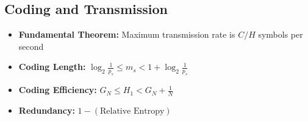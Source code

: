 \documentclass[12pt]{article}
\begin{document}
\subsection*{Coding and Transmission}
\begin{itemize}
    \item \textbf{Fundamental Theorem:} Maximum transmission rate is $C/H$ symbols per second
    \item \textbf{Coding Length:} $\log_2 \frac{1}{p_s} \leq m_s < 1 + \log_2 \frac{1}{p_s}$
    \item \textbf{Coding Efficiency:} $G_N \leq H_1 < G_N + \frac{1}{N}$
    \item \textbf{Redundancy:} $1 - (\text{Relative Entropy})$
\end{itemize}
\end{document}
